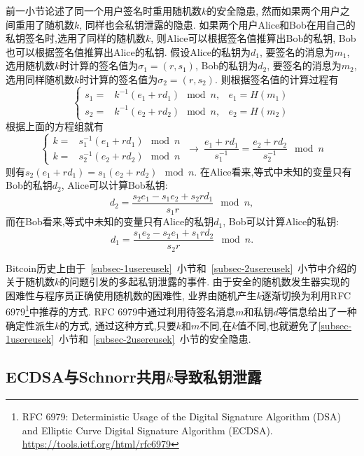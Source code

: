 \documentclass{article}
\begin{document}
前一小节论述了同一个用户签名时重用随机数$k$的安全隐患, 然而如果两个用户之间重用了随机数$k$, 同样也会私钥泄露的隐患.
如果两个用户Alice和Bob在用自己的私钥签名时,选用了同样的随机数$k$,
则Alice可以根据签名值推算出Bob的私钥, Bob也可以根据签名值推算出Alice的私钥.
假设Alice的私钥为$d_1$, 要签名的消息为$m_1$, 选用随机数$k$时计算的签名值为$\sigma_1 = (r, s_1)$,
Bob的私钥为$d_2$, 要签名的消息为$m_2$, 选用同样随机数$k$时计算的签名值为$\sigma_2 = (r, s_2)$.
则根据签名值的计算过程有
\begin{equation}\nonumber
\left\{
\begin{array}{lll}
s_1 = & k^{-1}(e_1 + rd_1) \mod n, & e_1 = H(m_1)\\
s_2 = & k^{-1}(e_2 + rd_2) \mod n, & e_2 = H(m_2)
\end{array}
\right.
\end{equation}
根据上面的方程组就有
\begin{equation}\nonumber
\left\{
\begin{array}{ll}
k = & s_1^{-1} (e_1 + rd_1) \mod n \\
k = & s_2^{-1} (e_2 + rd_2) \mod n
\end{array}
\right.
\ 
\rightarrow
\ 
\dfrac{e_1+rd_1}{s_1^{-1}} = \dfrac{e_2+rd_2}{s_2^{-1}} \mod n
\end{equation}
则有$s_2(e_1+rd_1) = s_1(e_2+rd_2) \mod n$.
在Alice看来,等式中未知的变量只有Bob的私钥$d_2$, Alice可以计算Bob私钥:
$$d_2 = \dfrac{s_2e_1 - s_1e_2 + s_2rd_1}{s_1r} \mod n,$$
而在Bob看来,等式中未知的变量只有Alice的私钥$d_1$, Bob可以计算Alice的私钥:
$$d_1 = \dfrac{s_1e_2 - s_2e_1 + s_1rd_2}{s_2r} \mod n.$$

Bitcoin历史上由于~\ref{subsec-1usereusek}~小节和~\ref{subsec-2usereusek}~小节中介绍的
关于随机数$k$的问题引发的多起私钥泄露的事件. 
由于安全的随机数发生器实现的困难性与程序员正确使用随机数的困难性,
业界由随机产生$k$逐渐切换为利用RFC 6979\footnote{
RFC 6979: Deterministic Usage of the Digital Signature Algorithm (DSA) and Elliptic Curve Digital Signature Algorithm (ECDSA).
\url{https://tools.ietf.org/html/rfc6979}}中推荐的方式.
RFC 6979中通过利用待签名消息$m$和私钥$d$等信息给出了一种确定性派生$k$的方式,
通过这种方式,只要$k$和$m$不同,在$k$值不同,也就避免了\ref{subsec-1usereusek}~小节和~\ref{subsec-2usereusek}~小节的安全隐患.

\subsection{ECDSA与Schnorr共用$k$导致私钥泄露\label{subsec-ecdsaschnorr}}
\end{document}

